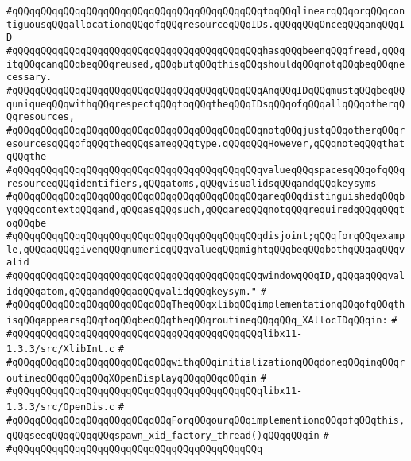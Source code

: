 \verb|#qQQqqQQqqQQqqQQqqQQqqQQqqQQqqQQqqQQqqQQqqQQqtoqQQqlinearqQQqorqQQqcontiguousqQQqallocationqQQqofqQQqresourceqQQqIDs.qQQqqQQqOnceqQQqanqQQqID|\newline
\verb|#qQQqqQQqqQQqqQQqqQQqqQQqqQQqqQQqqQQqqQQqqQQqhasqQQqbeenqQQqfreed,qQQqitqQQqcanqQQqbeqQQqreused,qQQqbutqQQqthisqQQqshouldqQQqnotqQQqbeqQQqnecessary.|\newline
\verb|#qQQqqQQqqQQqqQQqqQQqqQQqqQQqqQQqqQQqqQQqqQQqAnqQQqIDqQQqmustqQQqbeqQQquniqueqQQqwithqQQqrespectqQQqtoqQQqtheqQQqIDsqQQqofqQQqallqQQqotherqQQqresources,|\newline
\verb|#qQQqqQQqqQQqqQQqqQQqqQQqqQQqqQQqqQQqqQQqqQQqnotqQQqjustqQQqotherqQQqresourcesqQQqofqQQqtheqQQqsameqQQqtype.qQQqqQQqHowever,qQQqnoteqQQqthatqQQqthe|\newline
\verb|#qQQqqQQqqQQqqQQqqQQqqQQqqQQqqQQqqQQqqQQqqQQqvalueqQQqspacesqQQqofqQQqresourceqQQqidentifiers,qQQqatoms,qQQqvisualidsqQQqandqQQqkeysyms|\newline
\verb|#qQQqqQQqqQQqqQQqqQQqqQQqqQQqqQQqqQQqqQQqqQQqareqQQqdistinguishedqQQqbyqQQqcontextqQQqand,qQQqasqQQqsuch,qQQqareqQQqnotqQQqrequiredqQQqqQQqtoqQQqbe|\newline
\verb|#qQQqqQQqqQQqqQQqqQQqqQQqqQQqqQQqqQQqqQQqqQQqdisjoint;qQQqforqQQqexample,qQQqaqQQqgivenqQQqnumericqQQqvalueqQQqmightqQQqbeqQQqbothqQQqaqQQqvalid|\newline
\verb|#qQQqqQQqqQQqqQQqqQQqqQQqqQQqqQQqqQQqqQQqqQQqwindowqQQqID,qQQqaqQQqvalidqQQqatom,qQQqandqQQqaqQQqvalidqQQqkeysym."|\newline
\verb|#|\newline
\verb|#qQQqqQQqqQQqqQQqqQQqqQQqqQQqTheqQQqxlibqQQqimplementationqQQqofqQQqthisqQQqappearsqQQqtoqQQqbeqQQqtheqQQqroutineqQQqqQQq_XAllocIDqQQqin:|\newline
\verb|#|\newline
\verb|#qQQqqQQqqQQqqQQqqQQqqQQqqQQqqQQqqQQqqQQqqQQqlibx11-1.3.3/src/XlibInt.c|\newline
\verb|#|\newline
\verb|#qQQqqQQqqQQqqQQqqQQqqQQqqQQqwithqQQqinitializationqQQqdoneqQQqinqQQqroutineqQQqqQQqqQQqXOpenDisplayqQQqqQQqqQQqin|\newline
\verb|#|\newline
\verb|#qQQqqQQqqQQqqQQqqQQqqQQqqQQqqQQqqQQqqQQqqQQqlibx11-1.3.3/src/OpenDis.c|\newline
\verb|#|\newline
\verb|#qQQqqQQqqQQqqQQqqQQqqQQqqQQqForqQQqourqQQqimplementionqQQqofqQQqthis,qQQqseeqQQqqQQqqQQqspawn_xid_factory_thread()qQQqqQQqin|\newline
\verb|#|\newline
\verb|#qQQqqQQqqQQqqQQqqQQqqQQqqQQqqQQqqQQqqQQqqQQq|\newline
\newline
\newline

